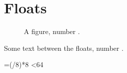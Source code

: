 \documentclass{article}
\begin{document}
\listoffigures
\clearpage
\listoftables
\clearpage
\section{Floats}
\loop
\begin{figure}[ht]\centering{}\caption{A figure, number \the\n.}\end{figure}
\begin{table}[ht]\centering{}\caption{A table, number \the\n.}\end{table}
Some text between the floats, number \the\n.\par
\advance{}
\ifnum\n=\numexpr(\n/8)*8\relax \clearpage\fi
\ifnum\n<64 \repeat
\end{document}
